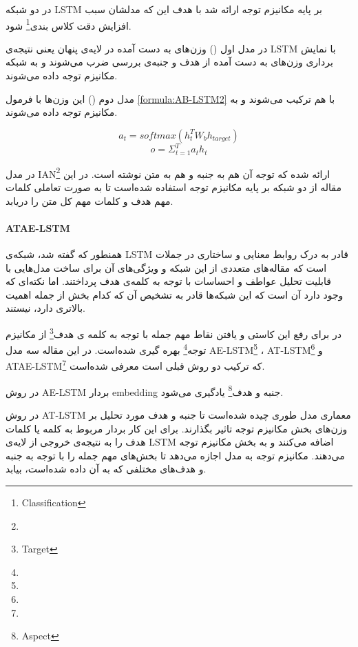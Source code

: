 \documentclass[12pt, a4paper, oneside]{report}
\begin{document}
در
\cite{74YANGATT}
دو شبکه
LSTM
بر پایه مکانیزم توجه ارائه شد با هدف این که مدلشان سبب افزایش دقت کلاس بندی\footnote{Classification}
شود.

در مدل اول
()
وزن‌های به دست آمده در لایه‌ی پنهان یعنی نتیجه‌ی
LSTM
با نمایش برداری وزن‌های به دست آمده از هدف و جنبه‌ی بررسی ضرب می‌شوند و به شبکه
مکانیزم توجه داده می‌شوند.

مدل دوم 
()
این وزن‌ها با فرمول 
\ref{formula:AB-LSTM2}
با هم ترکیب می‌شوند و به مکانیزم توجه داده می‌شوند.

\begin{equation}
    a_t=softmax(h_t^TW_bh_{target})
\end{equation}
\begin{equation}
    o={\Sigma_{t=1}^T a_th_t }
    \label{formula:AB-LSTM2}
\end{equation}

در
\cite{79ma2017interactive}
مدل
IAN\footnote{}
ارائه شده که توجه آن هم به جنبه و هم به متن نوشته است.
در این مقاله از دو شبکه بر پایه مکانیزم توجه استفاده شده‌است تا به صورت تعاملی کلمات مهم هدف و کلمات مهم
کل متن را دریابد.


\paragraph{ATAE-LSTM} \hfill \break

همنطور که گفته شد، شبکه‌ی
LSTM
قادر به درک روابط معنایی و ساختاری در جملات است که مقاله‌های متعددی از این شبکه و ویژگی‌های آن برای
ساخت مدل‌هایی با قابلیت تحلیل عواطف و احساسات با توجه به کلمه‌ی هدف پرداختند. اما نکته‌ای که وجود دارد آن است
که این شبکه‌ها قادر به تشخیص آن که کدام بخش از جمله اهمیت بالاتری دارد، نیستند.

در
\cite{73wang-etal-2016-attention}
برای رفع این کاستی و یافتن نقاط مهم جمله با توجه به کلمه ی هدف\footnote{Target}
از مکانیزم توجه\footnote{}
بهره گیری شده‌است. در این مقاله سه مدل
AE-LSTM\footnote{}
،
AT-LSTM\footnote{}
و
ATAE-LSTM\footnote{}
که ترکیب دو روش قبلی است معرفی شده‌است.

در روش
AE-LSTM
بردار
embedding
جنبه و هدف\footnote{Aspect}
یادگیری می‌شود.

در روش
AT-LSTM
معماری مدل طوری چیده شده‌است تا جنبه و هدف مورد تحلیل بر وزن‌های بخش مکانیزم توجه تاثیر بگذارند. برای این
کار بردار مربوط به کلمه یا کلمات هدف را به نتیجه‌ی خروجی از لایه‌ی
LSTM
اضافه می‌کنند و به بخش مکانیزم توجه می‌دهند. مکانیزم توجه به مدل اجازه می‌دهد تا بخش‌های مهم جمله را
با توجه به جنبه و هدف‌های مختلفی که به آن داده شده‌است، بیابد.
\end{document}
